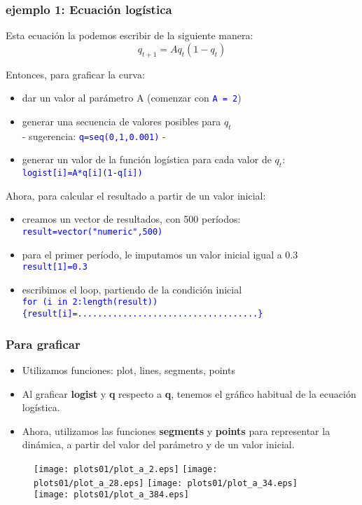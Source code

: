 \documentclass[11pt]{beamer}
\begin{document}
\begin{frame}
\frametitle{ejemplo 1: Ecuación logística}
\scriptsize
Esta ecuación la podemos escribir de la siguiente manera:
\begin{equation*}
q_{t+1}=Aq_{t}(1-q_t)
\end{equation*}

Entonces, para graficar la curva:
\begin{itemize}
	\item dar un valor al parámetro A (comenzar con \texttt{\textcolor{blue}{A = 2}})
	\item generar una secuencia de valores posibles para $q_t$ \\- sugerencia: \texttt{\textcolor{blue}{q=seq(0,1,0.001)}} -
	\item generar un valor de la función logística para cada valor de $q_t$: \texttt{\textcolor{blue}{logist[i]=A*q[i](1-q[i])}}
\end{itemize}
Ahora, para calcular el resultado a partir de un valor inicial:
\begin{itemize}
	\item creamos un vector de resultados, con 500 períodos: \texttt{\textcolor{blue}{result=vector("numeric",500)}}

	\item para el primer período, le imputamos un valor inicial igual a 0.3 \\\texttt{\textcolor{blue}{result[1]=0.3}}
	\item escribimos el loop, partiendo de la condición inicial\\
\texttt{\textcolor{blue}{for (i in 2:length(result)) \{result[i]=....................................\}}}
	\end{itemize}
\end{frame}

\begin{frame}
	\frametitle{Para graficar}
\begin{itemize}
	\item Utilizamos funciones: plot, lines, segments, points
	\item Al graficar \textbf{logist} y \textbf{q} respecto a \textbf{q}, tenemos el gráfico habitual de la ecuación logística.
	\item Ahora, utilizamos las funciones \textbf{segments} y \textbf{points} para representar la dinámica, a partir del valor del parámetro y de un valor inicial.
\end{itemize}	
\vspace{-0.4cm}
\begin{figure}
\centering
\texttt{[image: plots01/plot\_a\_2.eps]}
\texttt{[image: plots01/plot\_a\_28.eps]}
\texttt{[image: plots01/plot\_a\_34.eps]}
\texttt{[image: plots01/plot\_a\_384.eps]}
    \label{fig:my_label}
\end{figure}
\end{frame}
\end{document}
